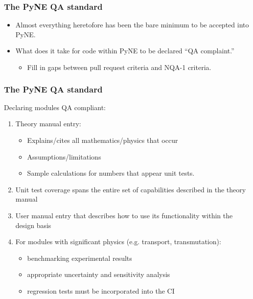 \documentclass[12pt]{beamer}
\begin{document}
\begin{frame}
\frametitle{The PyNE QA standard}

\begin{itemize}
\item{Almost everything heretofore has been the bare minimum to be accepted into PyNE.}
\item{What does it take for code within PyNE to be declared ``QA complaint.''}
    \begin{itemize}
    \item{Fill in gaps between pull request criteria and NQA-1 criteria.}
    \end{itemize}
\end{itemize}

\end{frame}

\begin{frame}
\frametitle{The PyNE QA standard}

Declaring modules QA compliant:
\begin{enumerate}
\item{Theory manual entry}:
    \begin{itemize}
    \item{Explains/cites all mathematics/physics that occur}
    \item{Assumptions/limitations}
    \item{Sample calculations for numbers that appear unit tests.}
    \end{itemize}
\item{Unit test coverage spans the entire set of capabilities described in the theory manual}
\item{User manual entry that describes how to use its functionality within the design basis}
\item{For modules with significant physics (e.g. transport, transmutation):}
    \begin{itemize}
    \item{benchmarking experimental results}
    \item{appropriate uncertainty and sensitivity analysis}
    \item{regression tests must be incorporated into the CI}
    \end{itemize}
\end{enumerate}

\end{frame}
\end{document}
